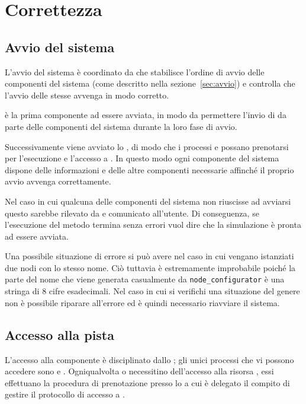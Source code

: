 \chapter{Correttezza}

\section{Avvio del sistema}
L'avvio del sistema è coordinato da \bootserv{} che stabilisce l'ordine di avvio delle componenti del sistema (come descritto nella sezione~\ref{sec:avvio}) e controlla che l'avvio delle stesse avvenga in modo corretto.

\evdisp{} è la prima componente ad essere avviata, in modo da permettere l'invio di  da parte delle componenti del sistema durante la loro fase di avvio.

Successivamente viene avviato lo \sched{}, di modo che i processi \weather{} e \car{} possano prenotarsi per l'esecuzione e l'accesso a \track{}. In questo modo ogni componente del sistema dispone delle informazioni e delle altre componenti necessarie affinché il proprio avvio avvenga correttamente.

Nel caso in cui qualcuna delle componenti del sistema non riuscisse ad avviarsi questo sarebbe rilevato da \bootserv{} e comunicato all'utente. Di conseguenza, se l'esecuzione del metodo  termina senza errori vuol dire che la simulazione è pronta ad essere avviata.

Una possibile situazione di errore si può avere nel caso in cui vengano istanziati due nodi \Erlang{} con lo stesso nome. Ciò tuttavia è estremamente improbabile poiché la parte del nome che viene generata casualmente da \texttt{node\_configurator} è una stringa di 8 cifre esadecimali. Nel caso in cui si verifichi una situazione del genere non è possibile riparare all'errore ed è quindi necessario riavviare il sistema.

\section{Accesso alla pista}
L'accesso alla componente \track{} è disciplinato dallo \sched{}; gli unici processi che vi possono accedere sono \car{} e \weather{}. Ogniqualvolta \car{} o \weather{} necessitino dell'accesso alla risorsa \track{}, essi effettuano la procedura di prenotazione presso lo \sched{} a cui è delegato il compito di gestire il protocollo di accesso a \track{}.

